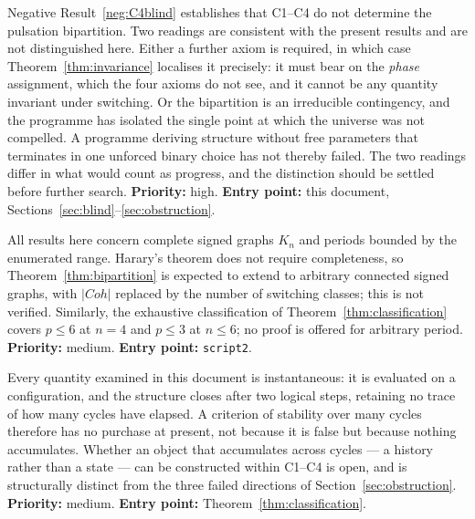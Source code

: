 \documentclass[11pt,a4paper]{article}
\def\mathrm#1{#1}%
\newcommand{\Kn}{K_n}
\newcommand{\Coh}{\mathrm{Coh}}
\begin{document}
\begin{openprobbox}
Negative Result~\ref{neg:C4blind} establishes that C1--C4 do not determine the pulsation bipartition. Two readings are consistent with the present results and are not distinguished here. Either a further axiom is required, in which case Theorem~\ref{thm:invariance} localises it precisely: it must bear on the \emph{phase} assignment, which the four axioms do not see, and it cannot be any quantity invariant under switching. Or the bipartition is an irreducible contingency, and the programme has isolated the single point at which the universe was not compelled. A programme deriving structure without free parameters that terminates in one unforced binary choice has not thereby failed. The two readings differ in what would count as progress, and the distinction should be settled before further search. \textbf{Priority:} high. \textbf{Entry point:} this document, Sections~\ref{sec:blind}--\ref{sec:obstruction}.
\end{openprobbox}

\begin{openprobbox}
All results here concern complete signed graphs $\Kn$ and periods bounded by the enumerated range. Harary's theorem does not require completeness, so Theorem~\ref{thm:bipartition} is expected to extend to arbitrary connected signed graphs, with $|\Coh|$ replaced by the number of switching classes; this is not verified. Similarly, the exhaustive classification of Theorem~\ref{thm:classification} covers $p\le6$ at $n=4$ and $p\le3$ at $n\le6$; no proof is offered for arbitrary period. \textbf{Priority:} medium. \textbf{Entry point:} \texttt{script2}.
\end{openprobbox}

\begin{openprobbox}
Every quantity examined in this document is instantaneous: it is evaluated on a configuration, and the structure closes after two logical steps, retaining no trace of how many cycles have elapsed. A criterion of stability over many cycles therefore has no purchase at present, not because it is false but because nothing accumulates. Whether an object that accumulates across cycles --- a history rather than a state --- can be constructed within C1--C4 is open, and is structurally distinct from the three failed directions of Section~\ref{sec:obstruction}. \textbf{Priority:} medium. \textbf{Entry point:} Theorem~\ref{thm:classification}.
\end{openprobbox}
\end{document}
